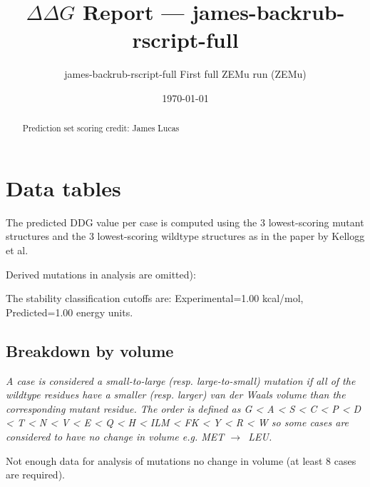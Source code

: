 \documentclass[10pt, letterpaper, oneside, titlepage, landscape]{scrreprt}
\title{$\Delta\Delta G$ Report --- james-backrub-rscript-full}
\subtitle{james-backrub-rscript-full First full ZEMu run (ZEMu)}
\date{\today}
\begin{document}
\maketitle
\tableofcontents

\clearpage

\begin{abstract}
Prediction set scoring credit: James Lucas

\end{abstract}


\clearpage

\section{Data tables}

The predicted DDG value per case is computed using the 3 lowest-scoring mutant structures and the 3 lowest-scoring wildtype structures as in the paper by Kellogg et al.

Derived mutations in analysis are omitted):

The stability classification cutoffs are: Experimental=1.00 kcal/mol, Predicted=1.00 energy units.
\subsection{Breakdown by volume}
\textit{A case is considered a small-to-large (resp. large-to-small) mutation if all of the wildtype residues have a smaller (resp. larger) van der Waals volume than the corresponding mutant residue. The order is defined as G < A < S < C < P < D < T < N < V < E < Q < H < ILM < FK < Y < R < W so some cases are considered to have no change in volume e.g. MET $\rightarrow$\ LEU.}

Not enough data for analysis of mutations no change in volume (at least 8 cases are required).
\end{document}
